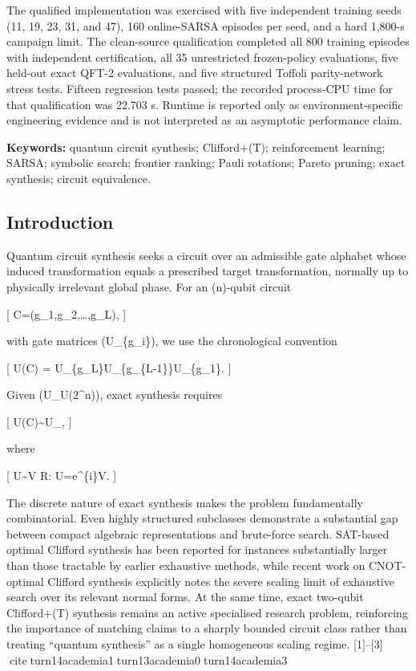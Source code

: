 \documentclass[
]{article}
\begin{document}
The qualified implementation was exercised with five independent
training seeds (11, 19, 23, 31, and 47), 160 online-SARSA episodes per
seed, and a hard 1,800-s campaign limit. The clean-source qualification
completed all 800 training episodes with independent certification, all
35 unrestricted frozen-policy evaluations, five held-out exact QFT-2
evaluations, and five structured Toffoli parity-network stress tests.
Fifteen regression tests passed; the recorded process-CPU time for that
qualification was 22.703 s. Runtime is reported only as
environment-specific engineering evidence and is not interpreted as an
asymptotic performance claim.

\textbf{Keywords:} quantum circuit synthesis; Clifford+(T);
reinforcement learning; SARSA; symbolic search; frontier ranking; Pauli
rotations; Pareto pruning; exact synthesis; circuit equivalence.

\hypertarget{introduction}{%
\subsection{Introduction}\label{introduction}}

Quantum circuit synthesis seeks a circuit over an admissible gate
alphabet whose induced transformation equals a prescribed target
transformation, normally up to physically irrelevant global phase. For
an (n)-qubit circuit

{[} C=(g\_1,g\_2,\ldots,g\_L), {]}

with gate matrices (U\_\{g\_i\}), we use the chronological convention

{[} U(C) = U\_\{g\_L\}U\_\{g\_\{L-1\}\}\cdots U\_\{g\_1\}.  {]}

Given (U\_\star\in U(2\^{}n)), exact synthesis requires

{[} U(C)\sim U\_\star,  {]}

where

{[} U\sim V \iff \exists\phi\in\mathbb R: U=e\^{}\{i\phi\}V.  {]}

The discrete nature of exact synthesis makes the problem fundamentally
combinatorial. Even highly structured subclasses demonstrate a
substantial gap between compact algebraic representations and
brute-force search. SAT-based optimal Clifford synthesis has been
reported for instances substantially larger than those tractable by
earlier exhaustive methods, while recent work on CNOT-optimal Clifford
synthesis explicitly notes the severe scaling limit of exhaustive search
over its relevant normal forms. At the same time, exact two-qubit
Clifford+(T) synthesis remains an active specialised research problem,
reinforcing the importance of matching claims to a sharply bounded
circuit class rather than treating ``quantum synthesis'' as a single
homogeneous scaling regime. {[}1{]}--{[}3{]}
citeturn14academia1turn13academia0turn14academia3
\end{document}
